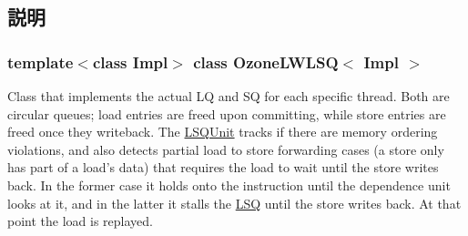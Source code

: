 \subsection{説明}
\subsubsection*{template$<$class Impl$>$ class OzoneLWLSQ$<$ Impl $>$}

Class that implements the actual LQ and SQ for each specific thread. Both are circular queues; load entries are freed upon committing, while store entries are freed once they writeback. The \hyperlink{classLSQUnit}{LSQUnit} tracks if there are memory ordering violations, and also detects partial load to store forwarding cases (a store only has part of a load's data) that requires the load to wait until the store writes back. In the former case it holds onto the instruction until the dependence unit looks at it, and in the latter it stalls the \hyperlink{classLSQ}{LSQ} until the store writes back. At that point the load is replayed. 

